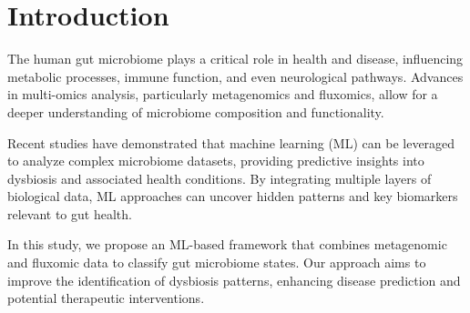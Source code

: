 \section{Introduction}

The human gut microbiome plays a critical role in health and disease, influencing metabolic processes, immune function, and even neurological pathways. Advances in multi-omics analysis, particularly metagenomics and fluxomics, allow for a deeper understanding of microbiome composition and functionality. 

Recent studies have demonstrated that machine learning (ML) can be leveraged to analyze complex microbiome datasets, providing predictive insights into dysbiosis and associated health conditions. By integrating multiple layers of biological data, ML approaches can uncover hidden patterns and key biomarkers relevant to gut health.

In this study, we propose an ML-based framework that combines metagenomic and fluxomic data to classify gut microbiome states. Our approach aims to improve the identification of dysbiosis patterns, enhancing disease prediction and potential therapeutic interventions.
